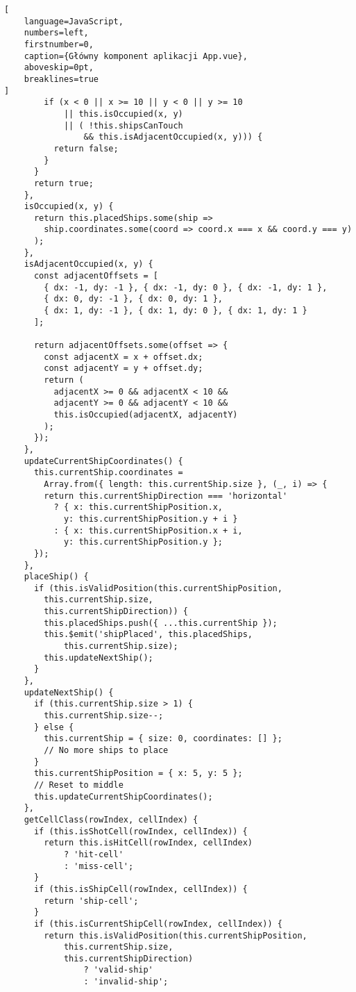 \begin{addmargin}[0mm]{0mm}
\begin{lstlisting}[
    language=JavaScript,
    numbers=left,
    firstnumber=0,
    caption={Główny komponent aplikacji App.vue},
    aboveskip=0pt,
    breaklines=true
]
        if (x < 0 || x >= 10 || y < 0 || y >= 10 
            || this.isOccupied(x, y)
            || ( !this.shipsCanTouch
                && this.isAdjacentOccupied(x, y))) {
          return false;
        }
      }
      return true;
    },
    isOccupied(x, y) {
      return this.placedShips.some(ship =>
        ship.coordinates.some(coord => coord.x === x && coord.y === y)
      );
    },
    isAdjacentOccupied(x, y) {
      const adjacentOffsets = [
        { dx: -1, dy: -1 }, { dx: -1, dy: 0 }, { dx: -1, dy: 1 },
        { dx: 0, dy: -1 }, { dx: 0, dy: 1 },
        { dx: 1, dy: -1 }, { dx: 1, dy: 0 }, { dx: 1, dy: 1 }
      ];

      return adjacentOffsets.some(offset => {
        const adjacentX = x + offset.dx;
        const adjacentY = y + offset.dy;
        return (
          adjacentX >= 0 && adjacentX < 10 &&
          adjacentY >= 0 && adjacentY < 10 &&
          this.isOccupied(adjacentX, adjacentY)
        );
      });
    },
    updateCurrentShipCoordinates() {
      this.currentShip.coordinates =
        Array.from({ length: this.currentShip.size }, (_, i) => {
        return this.currentShipDirection === 'horizontal'
          ? { x: this.currentShipPosition.x,
            y: this.currentShipPosition.y + i }
          : { x: this.currentShipPosition.x + i,
            y: this.currentShipPosition.y };
      });
    },
    placeShip() {
      if (this.isValidPosition(this.currentShipPosition,
        this.currentShip.size,
        this.currentShipDirection)) {
        this.placedShips.push({ ...this.currentShip });
        this.$emit('shipPlaced', this.placedShips,
            this.currentShip.size);
        this.updateNextShip();
      }
    },
    updateNextShip() {
      if (this.currentShip.size > 1) {
        this.currentShip.size--;
      } else {
        this.currentShip = { size: 0, coordinates: [] };
        // No more ships to place
      }
      this.currentShipPosition = { x: 5, y: 5 };
      // Reset to middle
      this.updateCurrentShipCoordinates();
    },
    getCellClass(rowIndex, cellIndex) {
      if (this.isShotCell(rowIndex, cellIndex)) {
        return this.isHitCell(rowIndex, cellIndex)
            ? 'hit-cell'
            : 'miss-cell';
      }
      if (this.isShipCell(rowIndex, cellIndex)) {
        return 'ship-cell';
      }
      if (this.isCurrentShipCell(rowIndex, cellIndex)) {
        return this.isValidPosition(this.currentShipPosition,
            this.currentShip.size,
            this.currentShipDirection)
                ? 'valid-ship'
                : 'invalid-ship';

\end{lstlisting}
\end{addmargin}
